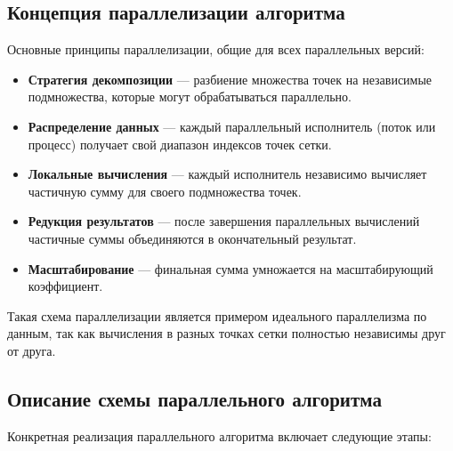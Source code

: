 \documentclass[a4paper,12pt]{article}
\begin{document}
  \subsection{Концепция параллелизации алгоритма}\label{subsec:parallel_concept}

  Основные принципы параллелизации, общие для всех параллельных версий:

  \begin{itemize}
    \item \textbf{Стратегия декомпозиции} --- разбиение множества точек на независимые подмножества, которые могут обрабатываться параллельно.

    \item \textbf{Распределение данных} --- каждый параллельный исполнитель (поток или процесс) получает свой диапазон индексов точек сетки.

    \item \textbf{Локальные вычисления} --- каждый исполнитель независимо вычисляет частичную сумму для своего подмножества точек.

    \item \textbf{Редукция результатов} --- после завершения параллельных вычислений частичные суммы объединяются в окончательный результат.

    \item \textbf{Масштабирование} --- финальная сумма умножается на масштабирующий коэффициент.
  \end{itemize}

  Такая схема параллелизации является примером идеального параллелизма по данным, так как вычисления в разных точках сетки полностью независимы друг от друга.

  \subsection{Описание схемы параллельного алгоритма}\label{subsec:parallel_scheme}

  Конкретная реализация параллельного алгоритма включает следующие этапы:
\end{document}
